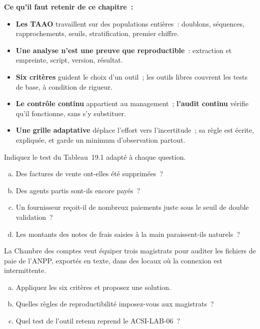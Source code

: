 \separateur

\begin{boxresume}
\textbf{Ce qu'il faut retenir de ce chapitre~:}
\begin{itemize}
    \item \textbf{Les TAAO} travaillent sur des populations entières~:
          doublons, séquences, rapprochements, seuils, stratification,
          premier chiffre.
    \item \textbf{Une analyse n'est une preuve que reproductible}~:
          extraction et empreinte, script, version, résultat.
    \item \textbf{Six critères} guident le choix d'un outil~; les outils
          libres couvrent les tests de base, à condition de rigueur.
    \item \textbf{Le contrôle continu} appartient au management~;
          \textbf{l'audit continu} vérifie qu'il fonctionne, sans s'y
          substituer.
    \item \textbf{Une grille adaptative} déplace l'effort vers
          l'incertitude~; sa règle est écrite, expliquée, et garde un
          minimum d'observation partout.
\end{itemize}
\end{boxresume}

\bigskip

\begin{boxexo}[title={\ding{45}\quad Exercice~19.1. Quel test~? \niveaubase}]
Indiquez le test du Tableau~19.1 adapté à chaque question.
\begin{enumerate}[(a)]
    \item Des factures de vente ont-elles été supprimées~?
    \item Des agents partis sont-ils encore payés~?
    \item Un fournisseur reçoit-il de nombreux paiements juste sous le seuil
          de double validation~?
    \item Les montants des notes de frais saisies à la main paraissent-ils
          naturels~?
\end{enumerate}
\end{boxexo}

\begin{boxexo}[title={\ding{45}\quad Exercice~19.2. Choisir un outil pour l'ANPP \niveaumoyen}]
La Chambre des comptes veut équiper trois magistrats pour auditer les
fichiers de paie de l'ANPP, exportés en texte, dans des locaux où la
connexion est intermittente.
\begin{enumerate}[(a)]
    \item Appliquez les six critères et proposez une solution.
    \item Quelles règles de reproductibilité imposez-vous aux magistrats~?
    \item Quel test de l'outil retenu reprend le ACSI-LAB-06~?
\end{enumerate}
\end{boxexo}

